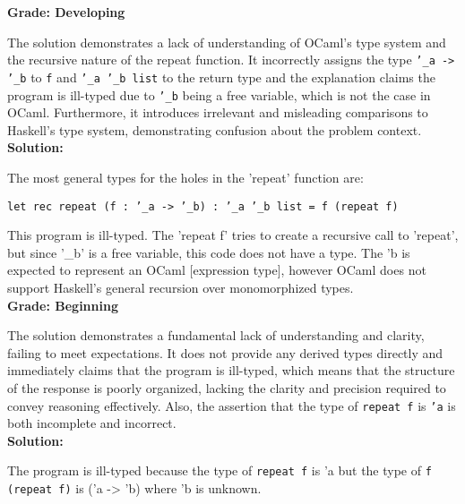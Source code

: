 \textbf{Grade: Developing}

The solution demonstrates a lack of understanding of OCaml's type system and the recursive nature of the repeat function. It incorrectly assigns the type \texttt{'\_a -> '\_b} to \texttt{f} and \texttt{'\_a '\_b list} to the return type and the explanation claims the program is ill-typed due to \texttt{'\_b} being a free variable, which is not the case in OCaml. Furthermore, it introduces irrelevant and misleading comparisons to Haskell's type system, demonstrating confusion about the problem context.
\\


\textbf{Solution:}


The most general types for the holes in the 'repeat' function are:

\texttt{let rec repeat (f : '\_a -> '\_b) : '\_a '\_b list = f (repeat f)}

This program is ill-typed. The 'repeat f' tries to create a recursive call to 'repeat', but since '\_b' is a free variable, this code does not have a type. The 'b is expected to represent an OCaml [expression type], however OCaml does not support Haskell's general recursion over monomorphized types.\\

\textbf{Grade: Beginning}

The solution demonstrates a fundamental lack of understanding and clarity, failing to meet expectations. It does not provide any derived types directly and immediately claims that the program is ill-typed,  which means that the structure of the response is poorly organized, lacking the clarity and precision required to convey reasoning effectively. Also, the assertion that the type of \texttt{repeat f} is \texttt{'a} is both incomplete and incorrect.
\\

\textbf{Solution:}

The program is ill-typed because the type of \texttt{repeat f} is 'a but the type of \texttt{f (repeat f)} is ('a -> 'b) where 'b is unknown.\\



